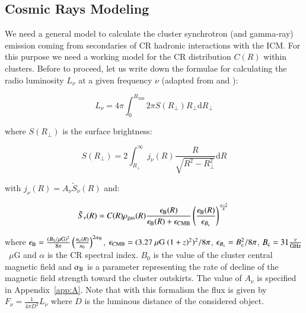 \documentclass[traditabstract]{aa}
\newcommand{\rmn}{\mathrm}
\begin{document}
\subsection{Cosmic Rays Modeling}
\label{sec:2.3}
We need a general model to calculate the cluster synchrotron (and gamma-ray) emission coming from secondaries of CR hadronic interactions with the ICM. For this purpose we need a working model for the CR distribution $C(R)$ within clusters. Before to proceed, let us write down the formulae for calculating the radio luminosity $L_{\nu}$ at a given frequency $\nu$ (adapted from \citealp{2008MNRAS.385.1211P} and \citealp{2011A&A...527A..99E}):

\begin{equation}
L_{\nu} = 4\pi \int_{0}^{R_{500}} 2\pi S(R_{\perp}) R_{\perp} \rmn{d}R_{\perp}
\label{eq:luminosity}
\end{equation}

where $S(R_{\perp})$ is the surface brightness:

\begin{equation}
S(R_{\perp}) = 2 \int_{R_{\perp}}^{\infty} j_{\nu}(R) \frac{R}{\sqrt{R^{2}-R_{\perp}^{2}}} \rmn{d}R
\label{eq:surface_brightness_1}
\end{equation}

with $ j_{\nu}(R)=A_{\nu}\tilde{S}_{\nu}(R)$ and:

\begin{equation}
\tilde{S}_{\nu}(R)  =  C(R) \rho_{\rm{gas}}(R) \frac{\epsilon_{\rm{B}}(R)}{\epsilon_{\rm{B}}(R)+\epsilon_{\rm{CMB}}} \left( \frac{\epsilon_{\rm{B}}(R)}{\epsilon_{B_{\rm{c}}}} \right)^{\frac{\alpha-2}{4}} \\
\label{eq:surface_brightness_2}
\end{equation}

where $\epsilon_{\rm{B}}=\frac{(B_{0}/\mu\rmn{G})^{2}}{8\pi}\left(\frac{n_{\rm{e}}(R)}{n_{0}}\right)^{2\alpha_{\rm{B}}}$, $\epsilon_{\rm{CMB}}=(3.27~\mu\rmn{G}~(1+z)^{2})^{2}/8\pi$, $\epsilon_{B_{\rm{c}}}=B_{\rm{c}}^{2}/8\pi$, $B_{\rm{c}}=31\frac{\nu}{\rmn{GHz}}$~$\mu$G and $\alpha$ is the CR spectral index. $B_{0}$ is the value of the cluster central magnetic field and $\alpha_{\rm{B}}$ is a parameter representing the rate of decline of the magnetic field strength toward the cluster outskirts. The value of $A_{\nu}$ is specified in Appendix~\ref{app:A}. 
Note that with this formalism the flux is given by $F_{\nu}=\frac{1}{4\pi D^{2}}L_{\nu}$ where $D$ is the luminous distance of the considered object.
\end{document}
